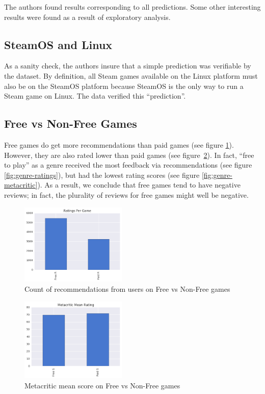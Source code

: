\documentclass[10pt,journal,compsoc]{IEEEtran}
\begin{document}
The authors found results corresponding to all predictions. Some other interesting
results were found as a result of exploratory analysis.

\subsection{SteamOS and Linux}

As a sanity check, the authors insure that a simple prediction was verifiable
by the dataset. By definition, all Steam games available on the Linux platform
must also be on the SteamOS platform because SteamOS is the only way to run a Steam
game on Linux. The data verified this ``prediction''.

\subsection{Free vs Non-Free Games}

Free games do get more recommendations than paid games (see figure
\ref{fig:freevnon-ratings}). However, they are also rated lower than paid
games (see figure~\ref{fig:freevnon-metacritic}). In fact, ``free to play'' as a
genre received the most feedback via recommendations (see figure
\ref{fig:genre-ratings}), but had the lowest rating scores (see figure
\ref{fig:genre-metacritic}). As a result, we conclude that free games tend to
have negative reviews; in fact, the plurality of reviews for free games might
well be negative.

\begin{figure}[h]
    \caption{Count of recommendations from users on Free vs Non-Free games \label{fig:freevnon-ratings}}
    \includegraphics[width=0.45\textwidth,keepaspectratio]{freevnon-ratings-bar}
\end{figure}

\begin{figure}[h]
    \caption{Metacritic mean score on Free vs Non-Free games \label{fig:freevnon-metacritic}}
    \includegraphics[width=0.45\textwidth,keepaspectratio]{freevnon-metacritic-bar}
\end{figure}
\end{document}

